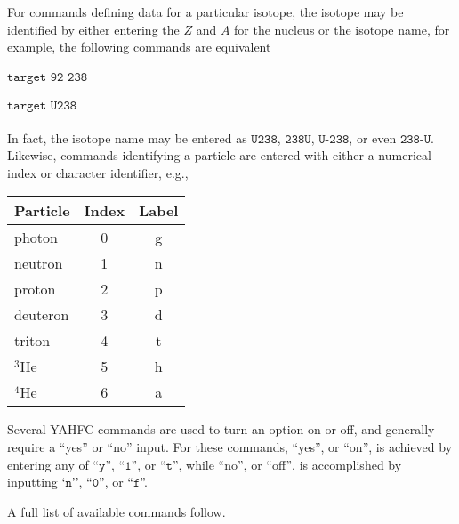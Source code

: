 \documentclass[
10pt,
showpacs,preprintnumbers,footinbib,
amsfonts,amsmath,amssymb,
aps,
prc,twocolumn,groupedaddress,superscriptaddress,
showkeys,
nofootinbib
]{revtex4-1}
\begin{document}
For commands defining data for a particular isotope, the isotope may be identified by either entering the $Z$ and $A$ for the nucleus or the isotope name, for example, the following commands are equivalent\\
\\
${\texttt{target 92 238}}$\\
\\
${\texttt{target U238}}$\\
\\
In fact, the isotope name may be entered as ${\texttt{U238}}$, ${\texttt{238U}}$, ${\texttt{U-238}}$, or even ${\texttt{238-U}}$. Likewise, commands identifying a particle are entered with either a numerical index or character identifier, e.g.,
\begin{center}
\begin{tabular} {| l | c | c |}
\hline
Particle & Index & Label \\
\hline\hline
photon & 0 & g \\
neutron & 1 & n\\
proton & 2 & p \\
deuteron & 3 & d \\
triton & 4 & t \\
$^3$He & 5 & h \\
$^4$He & 6 & a\\
\hline
\end{tabular}
\end{center}

Several YAHFC commands are used to turn an option on or off, and generally require a ``yes'' or ``no'' input. For these commands, ``yes'', or ``on'', is achieved by entering any of ``${\texttt{y}}$'', ``${\texttt{1}}$'', or ``${\texttt{t}}$'', while ``no'', or ``off'', is accomplished by inputting `${\texttt{n}}$'', ``${\texttt{0}}$'', or ``${\texttt{f}}$''.


A full list of available commands follow.
\end{document}
